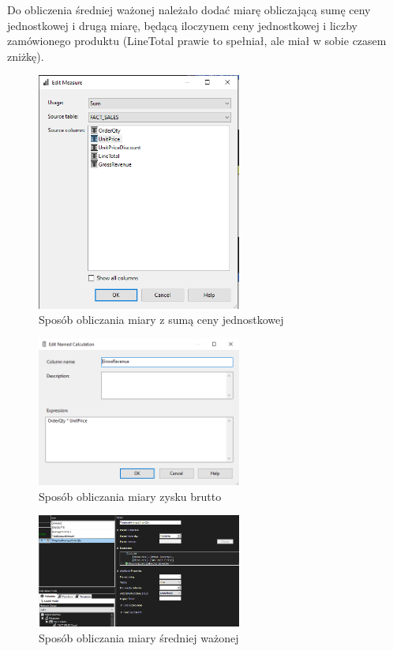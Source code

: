 \documentclass[a4paper,12pt]{article}
\begin{document}
Do obliczenia średniej ważonej należało dodać miarę obliczającą sumę ceny jednostkowej i drugą miarę, będącą iloczynem ceny jednostkowej i liczby zamówionego produktu (LineTotal prawie to spełniał, ale miał w sobie czasem zniżkę).

\begin{figure}[H]
  \centering
  \includegraphics[width=0.6\textwidth]{3_sum_unit_price.png}
  \caption{Sposób obliczania miary z sumą ceny jednostkowej}
\end{figure}

\begin{figure}[H]
  \centering
  \includegraphics[width=0.6\textwidth]{3_gross_revenue.png}
  \caption{Sposób obliczania miary zysku brutto}
\end{figure}

\begin{figure}[H]
  \centering
  \includegraphics[width=0.6\textwidth]{3_calculations_2.png}
  \caption{Sposób obliczania miary średniej ważonej}
\end{figure}
\end{document}
